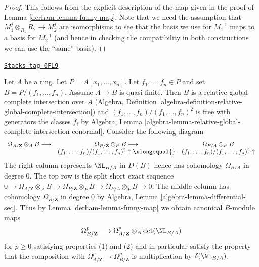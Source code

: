 \begin{proof}

This follows from the explicit description of the map given
in the proof of Lemma \ref{derham-lemma-funny-map}. Note that we need
the assumption that $M_1^j \otimes_{R_1} R_2 \to M_2^j$ are isomorphisms
to see that the basis we use for $M_1^{-1}$ maps to a basis
for $M_2^{-1}$ (and hence in checking the compatibility in
both constructions we can use the ``same'' basis).
\end{proof}

\begin{remark}
\label{derham-remark-local-description}
\href{https://stacks.math.columbia.edu/tag/0FL9}{\texttt{Stacks tag 0FL9}}

Let $A$ be a ring. Let $P = A[x_1, \ldots, x_n]$. Let
$f_1, \ldots, f_n \in P$ and set $B = P/(f_1, \ldots, f_n)$.
Assume $A \to B$ is quasi-finite. Then
$B$ is a relative global complete intersection over $A$ (Algebra, Definition
\ref{algebra-definition-relative-global-complete-intersection}) and
$(f_1, \ldots, f_n)/(f_1, \ldots, f_n)^2$ is free with generators
the classes $\overline{f}_i$ by Algebra, Lemma
\ref{algebra-lemma-relative-global-complete-intersection-conormal}.
Consider the following diagram
$$
\begin{array}{ccc}\Omega_{A/\mathbf{Z}} \otimes_A B \longrightarrow & \Omega_{P/\mathbf{Z}} \otimes_P B \longrightarrow & \Omega_{P/A} \otimes_P B \\  & (f_1, \ldots, f_n)/(f_1, \ldots, f_n)^2 \uparrow\xlongequal{} & (f_1, \ldots, f_n)/(f_1, \ldots, f_n)^2 \uparrow\end{array}
$$
The right column represents $\NL_{B/A}$ in $D(B)$ hence has cohomology
$\Omega_{B/A}$ in degree $0$. The top row is the split short exact sequence
$0 \to \Omega_{A/\mathbf{Z}} \otimes_A B \to
\Omega_{P/\mathbf{Z}} \otimes_P B \to \Omega_{P/A} \otimes_P B \to 0$.
The middle column has cohomology $\Omega_{B/\mathbf{Z}}$ in degree $0$
by Algebra, Lemma \ref{algebra-lemma-differential-seq}.
Thus by Lemma \ref{derham-lemma-funny-map} we obtain canonical $B$-module maps
$$
\Omega^p_{B/\mathbf{Z}} \longrightarrow
\Omega^p_{A/\mathbf{Z}} \otimes_A \det(\NL_{B/A})
$$
for $p \geq 0$ satisfying properties (1) and (2) and in particular
satisfy the property that the composition with
$\Omega^p_{A/\mathbf{Z}} \to \Omega^p_{B/\mathbf{Z}}$
is multiplication by $\delta(\NL_{B/A})$.
\end{remark}

